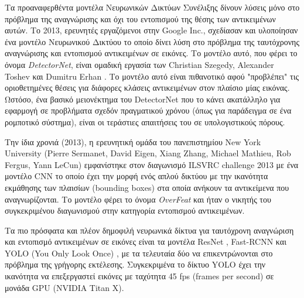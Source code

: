 Τα προαναφερθέντα μοντέλα Νευρωνικών Δικτύων Συνέλιξης δίνουν
λύσεις μόνο στο πρόβλημα της αναγνώρισης και όχι
του εντοπισμού της θέσης των αντικειμένων αυτών.
Το 2013, ερευνητές εργαζόμενοι στην Google Inc., σχεδίασαν και υλοποίησαν ένα
μοντέλο Νευρωνικού Δικτύου το οποίο δίνει λύση στο πρόβλημα της ταυτόχρονης
αναγνώρισης και εντοπισμού αντικειμένων σε εικόνες.
Το μοντέλο αυτό, που φέρει το όνομα \emph{DetectorNet}, είναι ομαδική εργασία των
Christian Szegedy, Alexander Toshev και Dumitru Erhan \cite{szegedy2013deep}. Το μοντέλο αυτό είναι
πιθανοτικό αφού "προβλέπει" τις οριοθετημένες θέσεις για διάφορες κλάσεις
αντικειμένων στον πλαίσιο μίας εικόνας. Ωστόσο, ένα βασικό μειονέκτημα του DetectorNet
που το κάνει ακατάλληλο για εφαρμογή σε προβλήματα σχεδόν πραγματικού χρόνου (όπως
για παράδειγμα σε ένα ρομποτικό σύστημα), είναι οι τεράστιες απαιτήσεις του σε
υπολογιστικούς πόρους.

Την ίδια χρονιά (2013), η ερευνητική ομάδα του πανεπιστημίου New York University
(Pierre Sermanet, David Eigen, Xiang Zhang, Michael Mathieu, Rob Fergus, Yann LeCun)
εμφανίστηκε στον διαγωνισμό ILSVRC challenge 2013 με ένα μοντέλο CNN το οποίο
έχει την μορφή ενός απλού δικτύου με την ικανότητα εκμάθησης
των πλαισίων (bounding boxes) στα οποία ανήκουν τα αντικείμενα που αναγνωρίζονται.
Το μοντέλο φέρει το όνομα \emph{OverFeat} \cite{sermanet2013overfeat} και ήταν
ο νικητής του συγκεκριμένου διαγωνισμού στην κατηγορία εντοπισμού αντικειμένων.

Τα πιο πρόσφατα και πλέον δημοφιλή νευρωνικά δίκτυα για ταυτόχρονη
αναγνώριση και εντοπισμό αντικειμένων σε εικόνες είναι τα μοντέλα
ResNet \cite{DBLP:journals/corr/HeZRS15}, Fast-RCNN \cite{DBLP:journals/corr/Girshick15}
και YOLO (You Only Look Once) \cite{DBLP:journals/corr/RedmonDGF15}, με τα
τελευταία δύο να επικεντρώνονται στο πρόβλημα της γρήγορης εκτέλεσης.
Συγκεκριμένα το δίκτυο YOLO έχει την ικανότητα να επεξεργαστεί εικόνες με
ταχύτητα 45 fps (frames per second) σε μονάδα GPU (NVIDIA Titan Χ).

